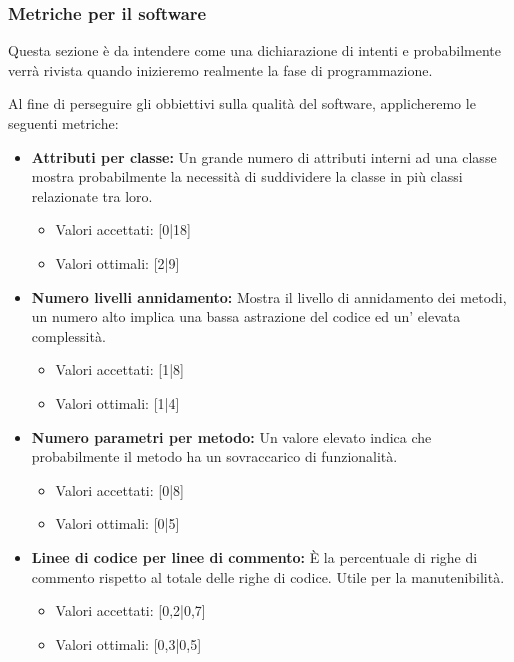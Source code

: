 \documentclass[a4paper]{article}
\begin{document}
				
				
			
			\subsubsection{Metriche per il software}
				Questa sezione è da intendere come una dichiarazione di intenti e probabilmente verrà rivista quando inizieremo 
				realmente la fase di programmazione.

				Al fine di perseguire gli obbiettivi sulla qualità del software, applicheremo le seguenti metriche:
				\begin{itemize}
					\item \textbf{Attributi per classe:}
						Un grande numero di attributi interni ad una classe mostra probabilmente la necessità di suddividere la classe 
						in più classi relazionate tra loro.
						\begin{itemize}
							\item Valori accettati: [0|18]
							\item Valori ottimali: [2|9]
						\end{itemize}

					\item \textbf{Numero livelli annidamento:}
						Mostra il livello di annidamento dei metodi, un numero alto implica una bassa astrazione del codice ed 
						un' elevata complessità.
						\begin{itemize}
							\item Valori accettati: [1|8]
							\item Valori ottimali: [1|4]
						\end{itemize}

					\item \textbf{Numero parametri per metodo:}
						Un valore elevato indica che probabilmente il metodo ha un sovraccarico di funzionalità.
						\begin{itemize}
							\item Valori accettati: [0|8]
							\item Valori ottimali: [0|5]
						\end{itemize}

					\item \textbf{Linee di codice per linee di commento:}
						È la percentuale di righe di commento rispetto al totale delle righe di codice. Utile per la manutenibilità.
						\begin{itemize}
							\item Valori accettati: [0,2|0,7]
							\item Valori ottimali: [0,3|0,5]
						\end{itemize}


\end{itemize}
\end{document}
